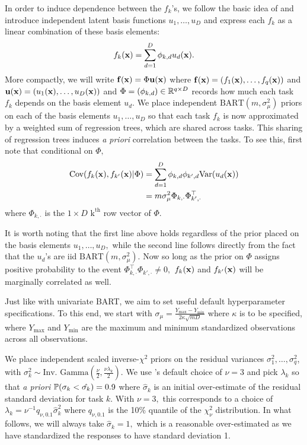 \documentclass[12pt]{article}
\begin{document}
In order to induce dependence between the $f_{k}$'s, we follow the basic idea of \citet{Teh2004} and introduce independent latent basis functions $u_{1}, \ldots, u_{D}$ and express each $f_{k}$ as a linear combination of these basis elements:
$$
f_{k}(\bx) = \sum_{d = 1}^{D}{\phi_{k,d}u_{d}(\bx)}.
$$
More compactly, we will write $\bf(\bx) = \Phi\bu(\bx)$ where $\bf(\bx) = (f_{1}(\bx), \ldots, f_{q}(\bx))$ and $\bu(\bx) = (u_{1}(\bx), \ldots, u_{D}(\bx))$ and $\Phi = (\phi_{k,d}) \in \R^{q \times D}$ records how much each task $f_{k}$ depends on the basis element $u_{d}.$
We place independent $\text{BART}(m, \sigma^{2}_{\mu})$ priors on each of the basis elements $u_{1}, \ldots, u_{D}$ so that each task $f_{k}$ is now approximated by a weighted sum of regression trees, which are shared across tasks.
This sharing of regression trees induces \textit{a priori} correlation between the tasks.
To see this, first note that conditional on $\Phi,$
\begin{align*}
\text{Cov}(f_{k}(\bx), f_{k'}(\bx) | \Phi) &= \sum_{d = 1}^{D}{\phi_{k,d}\phi_{k',d}\text{Var}(u_{d}(\bx))} \\
&= m\sigma^{2}_{\mu}\Phi_{k,\cdot}\Phi_{k',\cdot}^{\top}
\end{align*}
where $\Phi_{k,\cdot}$ is the $1 \times D$ $\text{k}^{\text{th}}$ row vector of $\Phi.$

It is worth noting that the first line above holds regardless of the prior placed on the basis elements $u_{1}, \ldots, u_{D},$ while the second line follows directly from the fact that the $u_{d}$'s are iid $\text{BART}(m,\sigma^{2}_{\mu}).$
Now so long as the prior on $\Phi$ assigns positive probability to the event $\Phi_{k,\cdot}^{\top}\Phi_{k',\cdot} \neq 0,$ $f_{k}(\bx)$ and $f_{k'}(\bx)$ will be marginally correlated as well. 

Just like with univariate BART, we aim to set useful default hyperparameter specifications.
To this end, we start with $\sigma_{\mu} = \frac{Y_{\max} - Y_{\min}}{2\kappa \sqrt{mD}}$ where $\kappa$ is to be specified, where $Y_{\max}$ and $Y_{\min}$ are the maximum and minimum standardized observations across all observations.

We place independent scaled inverse-$\chi^{2}$ priors on the residual variances $\sigma^{2}_{1}, \ldots, \sigma^{2}_{q}$, with $\sigma^{2}_{k} \sim \text{Inv. Gamma}\left(\frac{\nu}{2}, \frac{\nu\lambda_{k}}{2}\right).$
We use \citet{Chipman2010}'s default choice of $\nu = 3$ and pick $\lambda_{k}$ so that \textit{a priori} $\P(\sigma_{k} < \hat{\sigma_{k}}) = 0.9$ where $\hat{\sigma}_{k}$ is an initial over-estimate of the residual standard deviation for task $k.$
With $\nu = 3,$ this corresponds to a choice of $\lambda_{k} = \nu^{-1}q_{\nu,0.1}\hat{\sigma}^{2}_{k}$ where $q_{\nu,0.1}$ is the 10\% quantile of the $\chi^{2}_{\nu}$ distribution.
In what follows, we will always take $\hat{\sigma}_{k} = 1,$ which is a reasonable over-estimated as we have standardized the responses to have standard deviation 1. 
\end{document}
